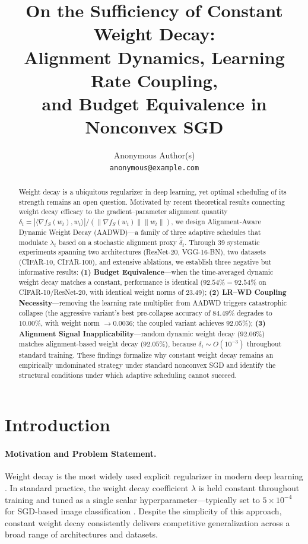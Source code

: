 \documentclass{article}
\title{On the Sufficiency of Constant Weight Decay:\\
Alignment Dynamics, Learning Rate Coupling,\\
and Budget Equivalence in Nonconvex SGD}
\author{%
  Anonymous Author(s)\\
  \texttt{anonymous@example.com}
}
\begin{document}
\maketitle

\begin{abstract}
Weight decay is a ubiquitous regularizer in deep learning, yet optimal scheduling of
its strength remains an open question.
Motivated by recent theoretical results connecting weight decay efficacy to the
gradient--parameter alignment quantity
$\delta_t = |\langle \nabla f_S(w_t), w_t \rangle| /
             (\|\nabla f_S(w_t)\| \|w_t\|)$,
we design Alignment-Aware Dynamic Weight Decay (AADWD)---a family of three adaptive
schedules that modulate $\lambda_t$ based on a stochastic alignment proxy
$\hat{\delta}_t$.
Through 39 systematic experiments spanning two architectures (ResNet-20, VGG-16-BN),
two datasets (CIFAR-10, CIFAR-100), and extensive ablations, we establish three
negative but informative results:
\textbf{(1) Budget Equivalence}---when the time-averaged dynamic weight decay matches
a constant, performance is identical ($92.54\% = 92.54\%$ on CIFAR-10/ResNet-20,
with identical weight norms of 23.49);
\textbf{(2) LR--WD Coupling Necessity}---removing the learning rate multiplier from
AADWD triggers catastrophic collapse (the aggressive variant's best pre-collapse
accuracy of $84.49\%$ degrades to $10.00\%$, with weight norm $\to 0.0036$; the
coupled variant achieves $92.05\%$);
\textbf{(3) Alignment Signal Inapplicability}---random dynamic weight decay
($92.06\%$) matches alignment-based weight decay ($92.05\%$), because
$\delta_t \sim O(10^{-3})$ throughout standard training.
These findings formalize why constant weight decay remains an empirically
undominated strategy under standard nonconvex SGD and identify the structural
conditions under which adaptive scheduling cannot succeed.
\end{abstract}

\section{Introduction}
\label{sec:intro}

\paragraph{Motivation and Problem Statement.}
Weight decay is the most widely used explicit regularizer in modern deep learning
\citep{loshchilov2019decoupled, zhang2019algorithmic}.
In standard practice, the weight decay coefficient $\lambda$ is held constant
throughout training and tuned as a single scalar hyperparameter---typically set to
$5 \times 10^{-4}$ for SGD-based image classification \citep{he2016deep}.
Despite the simplicity of this approach, constant weight decay consistently delivers
competitive generalization across a broad range of architectures and datasets.
\end{document}
